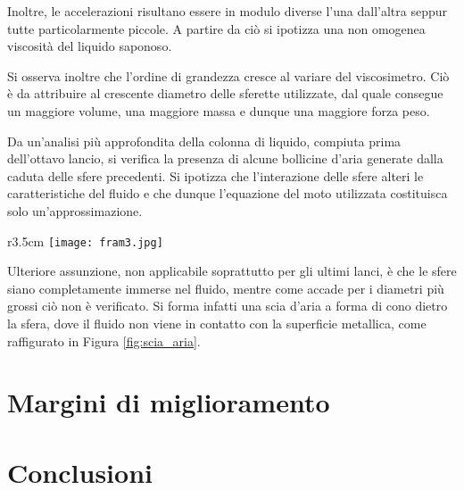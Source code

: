 \documentclass[a4paper,11pt,oneside]{article}
\begin{document}
Inoltre, le accelerazioni risultano essere in modulo diverse l'una dall'altra seppur tutte particolarmente piccole. A partire da ciò si ipotizza una non omogenea viscosità del liquido saponoso. 

Si osserva inoltre che l'ordine di grandezza cresce al variare del viscosimetro. Ciò è da attribuire al crescente diametro delle sferette utilizzate, dal quale consegue un maggiore volume, una maggiore massa e dunque una maggiore forza peso.




Da un'analisi più approfondita della colonna di liquido, compiuta prima dell'ottavo lancio, si verifica la presenza di alcune bollicine d'aria generate dalla caduta delle sfere precedenti. Si ipotizza che l'interazione delle sfere alteri le caratteristiche del fluido e che dunque l'equazione del moto utilizzata costituisca solo un'approssimazione.
\begin{wrapfigure}{r}{3.5cm}
    \centering
    \texttt{[image: fram3.jpg]}
    \caption{Scia d'aria}
    \label{fig:scia_aria}
\end{wrapfigure}
Ulteriore assunzione, non applicabile soprattutto per gli ultimi lanci, è che le sfere siano completamente immerse nel fluido, mentre come accade per i diametri più grossi ciò non è verificato. Si forma infatti una scia d'aria a forma di cono dietro la sfera, dove il fluido non viene in contatto con la superficie metallica, come raffigurato in Figura \ref{fig:scia_aria}.










\section{Margini di miglioramento}


\section{Conclusioni}
\end{document}
